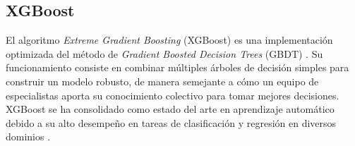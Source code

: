 \documentclass[letterpaper,12pt, twoside]{report}
\providecommand{\DIFdeltex}[1]{{\protect\color{red} \scriptsize #1}} %
\providecommand{\DIFdel}[1]{\texorpdfstring{\DIFdeltex{#1}}{}} %
\begin{document}

\subsection{\DIFdel{XGBoost}}
\addtocounter{subsection}{-1}%

\DIFdel{El algoritmo \textit{Extreme Gradient Boosting} (XGBoost) es una implementación optimizada del método de \textit{Gradient Boosted Decision Trees} (GBDT) \citep{chen2016xgboost}.
Su funcionamiento consiste en combinar múltiples árboles de decisión simples para construir un modelo robusto, de manera semejante a cómo un equipo de especialistas aporta su conocimiento colectivo para tomar mejores decisiones.
XGBoost se ha consolidado como estado del arte en aprendizaje automático debido a su alto desempeño en tareas de clasificación y regresión en diversos dominios \citep{espinoza2020aplicacion}.}%
\end{document}
